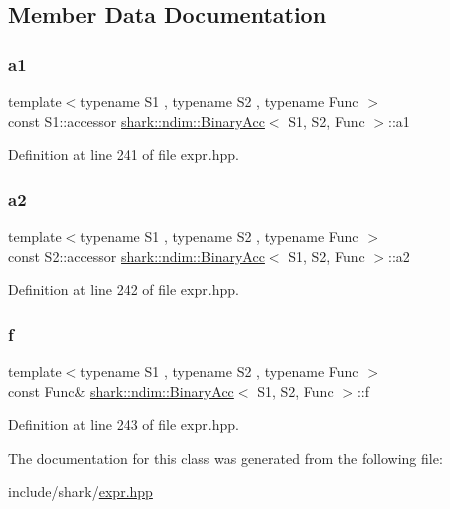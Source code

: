 \subsection{Member Data Documentation}
\hypertarget{classshark_1_1ndim_1_1_binary_acc_ad506fa496dc01e94b8e40cce878d55e4}{}\label{classshark_1_1ndim_1_1_binary_acc_ad506fa496dc01e94b8e40cce878d55e4} 
\subsubsection{\texorpdfstring{a1}{a1}}
{\footnotesize\ttfamily template$<$typename S1 , typename S2 , typename Func $>$ \\
const S1\+::accessor \hyperlink{classshark_1_1ndim_1_1_binary_acc}{shark\+::ndim\+::\+Binary\+Acc}$<$ S1, S2, Func $>$\+::a1\hspace{0.3cm}{\ttfamily [private]}}



Definition at line 241 of file expr.\+hpp.

\hypertarget{classshark_1_1ndim_1_1_binary_acc_a85cdf9eb043152a0c54bf58809edf165}{}\label{classshark_1_1ndim_1_1_binary_acc_a85cdf9eb043152a0c54bf58809edf165} 
\subsubsection{\texorpdfstring{a2}{a2}}
{\footnotesize\ttfamily template$<$typename S1 , typename S2 , typename Func $>$ \\
const S2\+::accessor \hyperlink{classshark_1_1ndim_1_1_binary_acc}{shark\+::ndim\+::\+Binary\+Acc}$<$ S1, S2, Func $>$\+::a2\hspace{0.3cm}{\ttfamily [private]}}



Definition at line 242 of file expr.\+hpp.

\hypertarget{classshark_1_1ndim_1_1_binary_acc_ab0c1983b8ee09760742353828229262f}{}\label{classshark_1_1ndim_1_1_binary_acc_ab0c1983b8ee09760742353828229262f} 
\subsubsection{\texorpdfstring{f}{f}}
{\footnotesize\ttfamily template$<$typename S1 , typename S2 , typename Func $>$ \\
const Func\& \hyperlink{classshark_1_1ndim_1_1_binary_acc}{shark\+::ndim\+::\+Binary\+Acc}$<$ S1, S2, Func $>$\+::f\hspace{0.3cm}{\ttfamily [private]}}



Definition at line 243 of file expr.\+hpp.



The documentation for this class was generated from the following file\+:\begin{DoxyCompactItemize}
\item 
include/shark/\hyperlink{expr_8hpp}{expr.\+hpp}\end{DoxyCompactItemize}
